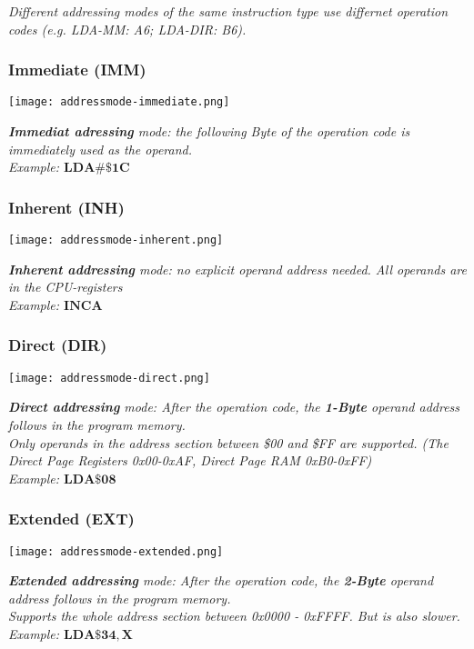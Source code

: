 \textit{
    Different addressing modes of the same instruction type use differnet
    operation codes (e.g. LDA-MM: A6; LDA-DIR: B6). \\
}

\subsubsection{Immediate (IMM)}

\texttt{[image: addressmode-immediate.png]}

\textit{
    \textbf{Immediat adressing} mode: the following Byte of the operation code
    is immediately used as the operand. \\
    Example: $\mathbf{LDA \#\$1C}$
}

\subsubsection{Inherent (INH)}

\texttt{[image: addressmode-inherent.png]}

\textit{
    \textbf{Inherent addressing} mode: no explicit operand address needed.
    All operands are in the CPU-registers \\
    Example: $\mathbf{INCA}$
}

\subsubsection{Direct (DIR)}

\texttt{[image: addressmode-direct.png]}

\textit{
    \textbf{Direct addressing} mode: After the operation code, the
    \textbf{1-Byte} operand address follows in the program memory. \\
    Only operands in the address section between \$00 and \$FF are
    supported. (The Direct Page Registers 0x00-0xAF, Direct Page RAM 0xB0-0xFF) \\
    Example: $\mathbf{LDA \$08}$
}

\subsubsection{Extended (EXT)}

\texttt{[image: addressmode-extended.png]}

\textit{
    \textbf{Extended addressing} mode: After the operation code, the \textbf{2-Byte}
    operand address follows in the program memory. \\
    Supports the whole address section between 0x0000 - 0xFFFF. But is also slower. \\
    Example: $\mathbf{LDA \$34,X}$
}

